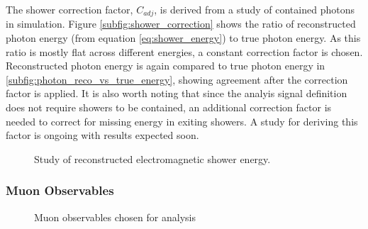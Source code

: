 \documentclass[../main.tex]{subfiles}
\begin{document}
The shower correction factor, $C_{adj}$, is derived from a study of contained photons in simulation.  Figure \ref{subfig:shower_correction} shows the ratio of reconstructed photon energy (from equation \ref{eq:shower_energy}) to true photon energy.  As this ratio is mostly flat across different energies, a constant correction factor is chosen.  Reconstructed photon energy is again compared to true photon energy in \ref{subfig:photon_reco_vs_true_energy}, showing agreement after the correction factor is applied.  It is also worth noting that since the analyis signal definition does not require showers to be contained, an additional correction factor is needed to correct for missing energy in exiting showers.  A study for deriving this factor is ongoing with results expected soon.

\begin{figure}[H]
    \center
    \caption{Study of reconstructed electromagnetic shower energy.}
    \label{fig:photon_energy}
\end{figure}

\subsubsection{Muon Observables}
\begin{figure}[H]
    \center
    \caption{Muon observables chosen for analysis}
    \label{fig:muon_observables_mc}
\end{figure}
\end{document}
